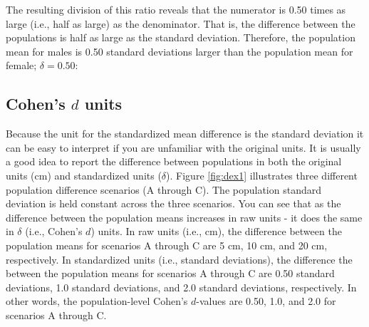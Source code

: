 \documentclass[
]{krantz}
\begin{document}
The resulting division of this ratio reveals that the numerator is 0.50 times as large (i.e., half as large) as the denominator. That is, the difference between the populations is half as large as the standard deviation. Therefore, the population mean for males is 0.50 standard deviations larger than the population mean for female; \(\delta = 0.50\):

\hypertarget{cohens-d-units}{%
\subsection{\texorpdfstring{Cohen's \(d\) units}{Cohen's d units}}\label{cohens-d-units}}

Because the unit for the standardized mean difference is the standard deviation it can be easy to interpret if you are unfamiliar with the original units. It is usually a good idea to report the difference between populations in both the original units (cm) and standardized units (\(\delta\)). Figure \ref{fig:dex1} illustrates three different population difference scenarios (A through C). The population standard deviation is held constant across the three scenarios. You can see that as the difference between the population means increases in raw units - it does the same in \(\delta\) (i.e., Cohen's \(d\)) units. In raw units (i.e., cm), the difference between the population means for scenarios A through C are 5 cm, 10 cm, and 20 cm, respectively. In standardized units (i.e., standard deviations), the difference the between the population means for scenarios A through C are 0.50 standard deviations, 1.0 standard deviations, and 2.0 standard deviations, respectively. In other words, the population-level Cohen's \(d\)-values are 0.50, 1.0, and 2.0 for scenarios A through C.
\end{document}
